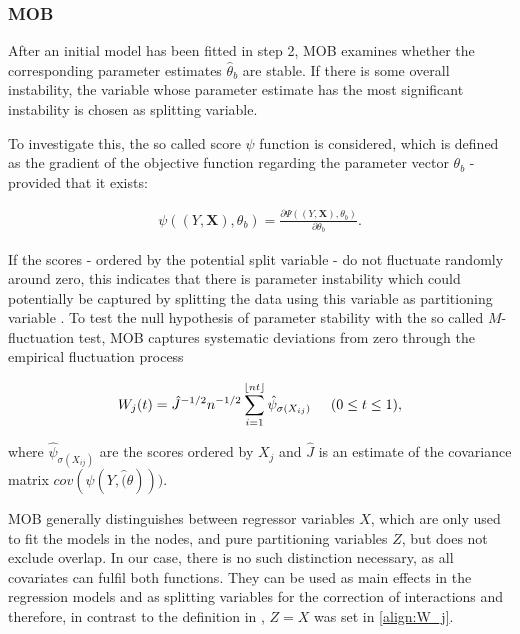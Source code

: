 \subsubsection{MOB}
After an initial model has been fitted in step 2, MOB examines whether the corresponding parameter estimates $\hat{\theta}_b$ are stable. If there is some overall instability, the variable whose parameter estimate has the most significant instability is chosen as splitting variable.

To investigate this, the so called score $\psi$ function is considered, which is defined as the
gradient of the objective function regarding the parameter vector $\theta_b$ - provided that it exists:

\begin{align}
    \psi \left( \left( Y, \mathbf{X} \right), \theta_b \right) = \frac{\partial \Psi\left( \left( Y, \mathbf{X} \right), \theta_b \right)}{\partial \theta_b}.
\end{align}

\citep{Zeileis.2008}

If the scores - ordered by the potential split variable - do not fluctuate randomly around zero, this indicates that there is parameter instability which could potentially be captured by splitting the data using this variable as partitioning variable \citep{Schlosser.2019}.
To test the null hypothesis of parameter stability with the so called $M$-fluctuation test, MOB captures systematic deviations from zero through the empirical fluctuation process

\begin{align}\label{align:W_j}
    W_{j}(t) = \hat{J}^{-1/2}n^{-1/2}\sum_{i = 1}^{\lfloor nt \rfloor} \hat{\psi}_{\sigma(X_{ij})} \hspace{0.5cm} (0 \leq t \leq 1), 
\end{align}

where $\hat{\psi}_{\sigma(X_{ij})}$ are the scores ordered by $X_{j}$ and $\hat{J}$ is an estimate of the covariance matrix $cov(\psi(Y, \hat(\theta)))$. \citep{Zeileis.2008}

MOB generally distinguishes between regressor variables $X$, which are only used to fit the models in the nodes, and pure partitioning variables $Z$, but does not exclude overlap. In our case, there is no such distinction necessary, as all covariates can fulfil both functions.  They can be used as main effects in the regression models and as splitting variables for the correction of interactions and therefore, in contrast to the definition in \citep{Zeileis.2008}, $Z = X$ was set in \ref{align:W_j}.


